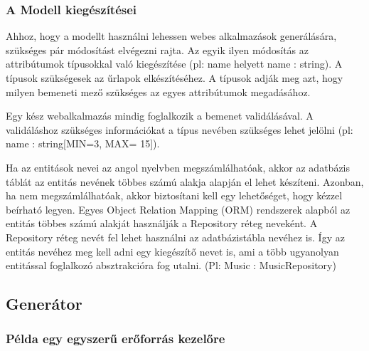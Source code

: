 \documentclass[a4paper,12pt,oneside]{report}
\begin{document}
\newpage
\subsubsection{A Modell kiegészítései }

\begin{justify}

	Ahhoz, hogy a modellt használni lehessen webes alkalmazások generálására, szükséges pár módosítást elvégezni rajta. Az egyik ilyen módosítás az attribútumok típusokkal való kiegészítése (pl: name helyett name : string). A típusok szükségesek az űrlapok elkészítéséhez. A típusok adják meg azt, hogy milyen bemeneti mező szükséges az egyes attribútumok megadásához.

	Egy kész webalkalmazás mindig foglalkozik a bemenet validálásával. A validáláshoz szükséges információkat a típus nevében szükséges lehet jelölni (pl: name : string[MIN=3, MAX= 15]).

	Ha az entitások nevei az angol nyelvben megszámlálhatóak, akkor az adatbázis táblát az entitás nevének többes számú alakja alapján el lehet készíteni. Azonban, ha nem megszámlálhatóak, akkor biztosítani kell egy lehetőséget, hogy kézzel beírható legyen. Egyes Object Relation Mapping (ORM) rendszerek alapból az entitás többes számú alakját használják a Repository réteg neveként. A Repository réteg nevét fel lehet használni az adatbázistábla nevéhez is. Így az entitás nevéhez meg kell adni egy kiegészítő nevet is, ami a több ugyanolyan entitással foglalkozó absztrakcióra fog utalni. (Pl: Music : MusicRepository)

\end{justify}

\newpage
\subsection{Generátor}
\subsubsection{Példa egy egyszerű erőforrás kezelőre}
\end{document}
